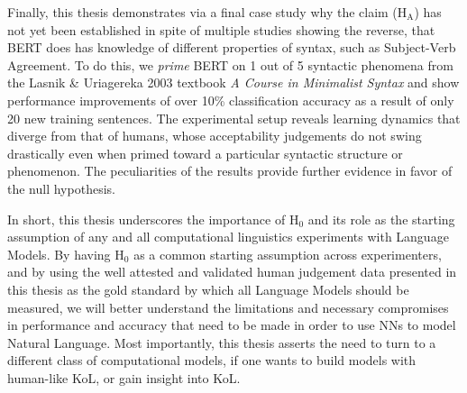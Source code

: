 Finally, this thesis demonstrates via a final case study why the claim ($\mathrm{H}_\mathrm{A}$) has not yet been established in spite of multiple studies showing the reverse, that BERT does has knowledge of different properties of syntax, such as Subject-Verb Agreement.  To do this, we \textit{prime} BERT on 1 out of 5 syntactic phenomena from the Lasnik & Uriagereka 2003 textbook \textit{A Course in Minimalist Syntax} and show performance improvements of over 10\% classification accuracy as a result of only 20 new training sentences.  The experimental setup reveals learning dynamics that diverge from that of humans, whose acceptability judgements do not swing drastically even when primed toward a particular syntactic structure or phenomenon.  The peculiarities of the results provide further evidence in favor of the null hypothesis.

In short, this thesis underscores the importance of $\mathrm{H}_0$ and its role as the starting assumption of any and all computational linguistics experiments with Language Models.  By having $\mathrm{H}_0$ as a common starting assumption across experimenters, and by using the well attested and validated human judgement data presented in this thesis as the gold standard by which all Language Models should be measured, we will better understand the limitations and necessary compromises in performance and accuracy that need to be made in order to use NNs to model Natural Language.  Most importantly, this thesis asserts the need to turn to a different class of computational models, if one wants to build models with human-like KoL, or gain insight into KoL.
